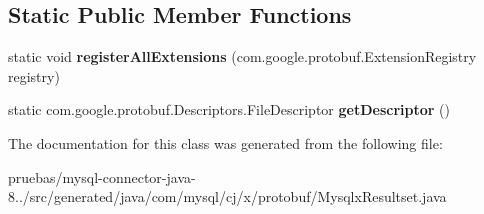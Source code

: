 \subsection*{Static Public Member Functions}
\begin{DoxyCompactItemize}
\item 
\mbox{\label{classcom_1_1mysql_1_1cj_1_1x_1_1protobuf_1_1_mysqlx_resultset_a454d73bc7df06ec929d3ae02151cfa46}} 
static void {\bfseries register\+All\+Extensions} (com.\+google.\+protobuf.\+Extension\+Registry registry)
\item 
\mbox{\label{classcom_1_1mysql_1_1cj_1_1x_1_1protobuf_1_1_mysqlx_resultset_a33c6d641687267a96a47b07b795fe1ea}} 
static com.\+google.\+protobuf.\+Descriptors.\+File\+Descriptor {\bfseries get\+Descriptor} ()
\end{DoxyCompactItemize}


The documentation for this class was generated from the following file\+:\begin{DoxyCompactItemize}
\item 
pruebas/mysql-\/connector-\/java-\/8../src/generated/java/com/mysql/cj/x/protobuf/Mysqlx\+Resultset.\+java\end{DoxyCompactItemize}
